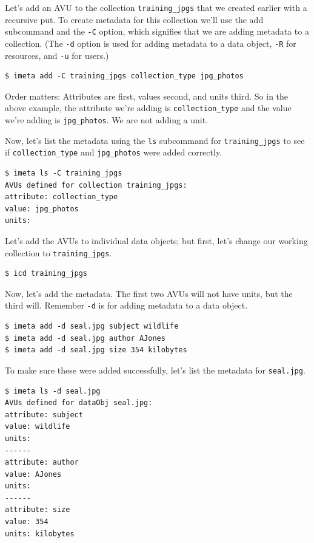\documentclass[10pt,oneside]{memoir}
\begin{document}
Let's add an AVU to the collection \texttt{training\_jpgs} that we created earlier with a recursive put. To create metadata for this collection we'll use the add subcommand and the \texttt{-C} option, which signifies that we are adding metadata to a collection. (The \texttt{-d} option is used for adding metadata to a data object, \texttt{-R} for resources, and \texttt{-u} for users.)

\begin{lstlisting}
$ imeta add -C training_jpgs collection_type jpg_photos
\end{lstlisting}

Order matters: Attributes are first, values second, and units third. So in the above example, the attribute we're adding is \texttt{collection\_type} and the value we're adding is \texttt{jpg\_photos}. We are not adding a unit.

Now, let's list the metadata using the \texttt{ls} subcommand for \texttt{training\_jpgs} to see if \texttt{collection\_type} and \texttt{jpg\_photos} were added correctly.

\begin{lstlisting}
$ imeta ls -C training_jpgs
AVUs defined for collection training_jpgs:
attribute: collection_type
value: jpg_photos
units:
\end{lstlisting}

Let's add the AVUs to individual data objects; but first, let's change our working collection to \texttt{training\_jpgs}.

\begin{lstlisting}
$ icd training_jpgs
\end{lstlisting}

Now, let's add the metadata. The first two AVUs will not have units, but the third will. Remember \texttt{-d} is for adding metadata to a data object.

\begin{lstlisting}
$ imeta add -d seal.jpg subject wildlife
$ imeta add -d seal.jpg author AJones
$ imeta add -d seal.jpg size 354 kilobytes
\end{lstlisting}

To make sure these were added successfully, let's list the metadata for \texttt{seal.jpg}.

\begin{lstlisting}
$ imeta ls -d seal.jpg
AVUs defined for dataObj seal.jpg:
attribute: subject
value: wildlife
units:
------
attribute: author
value: AJones
units:
------
attribute: size
value: 354
units: kilobytes
\end{lstlisting}
\end{document}
